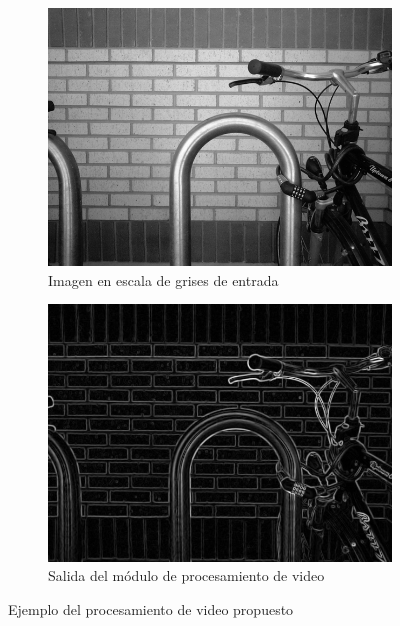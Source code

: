 \documentclass[10pt, letterpaper, conference]{IEEEtran}
\begin{document}
\begin{figure}[!h]
  \centering
  \begin{subfigure}{0.45\columnwidth}
    \centering
    \includegraphics[width=\columnwidth]{img/bike_gray.jpg}
    \caption{Imagen en escala de grises de entrada}
    \label{fig:bike_gray}
  \end{subfigure}
  \hfill
  \begin{subfigure}{0.45\columnwidth}
      \centering
      \includegraphics[width=\columnwidth]{img/bike_sobel.jpg}
      \caption{Salida del m\'odulo de procesamiento de video}
      \label{fig:bike_sobel}
  \end{subfigure}
  \hfill
    \caption{Ejemplo del procesamiento de video propuesto}
    \label{fig:processing_unit_example}
\end{figure}
\end{document}
